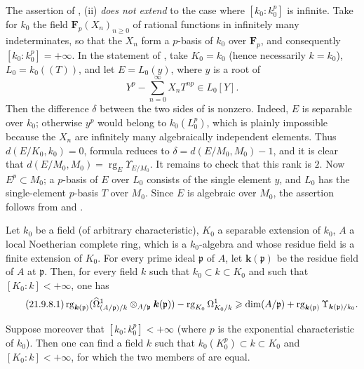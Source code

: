 \begin{remark}[21.9.7]
\label{0.21.9.7}
The assertion of , (ii) \emph{does not extend} to the case where $[k_0:k_0^p]$ is infinite.
Take for $k_0$ the field $\mathbf{F}_p(X_n)_{n\geqslant0}$ of rational functions in infinitely many indeterminates, so that the $X_n$ form a $p$-basis of $k_0$ over $\mathbf{F}_p$, and consequently $[k_0:k_0^p]=+\infty$.
In the statement of , take $K_0=k_0$ (hence necessarily $k=k_0$), $L_0=k_0((T))$, and let $E=L_0(y)$, where $y$ is a root of
\[
  Y^p-\sum_{n=0}^{\infty}X_nT^{np}\in L_0[Y].
\]
Then the difference $\delta$ between the two sides of  is nonzero.
Indeed, $E$ is separable over $k_0$; otherwise $y^p$ would belong to $k_0(L_0^p)$, which is plainly impossible because the $X_n$ are infinitely many algebraically independent elements.
Thus $d(E/K_0,k_0)=0$, formula  reduces to $\delta=d(E/M_0,M_0)-1$, and it is clear that $d(E/M_0,M_0)=\operatorname{rg}_E\Upsilon_{E/M_0}$.
It remains to check that this rank is $2$.
Now $E^p\subset M_0$; a $p$-basis of $E$ over $L_0$ consists of the single element $y$, and $L_0$ has the single-element $p$-basis $T$ over $M_0$.
Since $E$ is algebraic over $M_0$, the assertion follows from  and .
\end{remark}

\begin{proposition}[21.9.8]
\label{0.21.9.8}
Let $k_0$ be a field \textup{(}of arbitrary characteristic\textup{)}, $K_0$ a separable extension of $k_0$, $A$ a local Noetherian complete ring, which is a $k_0$-algebra and whose residue field is a finite extension of $K_0$.
For every prime ideal $\mathfrak{p}$ of $A$, let $\boldsymbol{k}(\mathfrak{p})$ be the residue field of $A$ at $\mathfrak{p}$.
Then, for every field $k$ such that $k_0\subset k\subset K_0$ and such that $[K_0:k]<+\infty$, one has
\begin{equation}
\tag{21.9.8.1}
  \label{0.21.9.8.1}
  \operatorname{rg}_{\boldsymbol{k}(\mathfrak{p})}(\widehat{\Omega}^1_{(A/\mathfrak{p})/k}\otimes_{A/\mathfrak{p}} \boldsymbol{k}(\mathfrak{p}))-\operatorname{rg}_{K_0}\Omega^1_{K_0/k}\geqslant\dim(A/\mathfrak{p})+\operatorname{rg}_{\boldsymbol{k}(\mathfrak{p})}\Upsilon_{\boldsymbol{k}(\mathfrak{p})/k_0}.
\end{equation}

Suppose moreover that $[k_0:k_0^p]<+\infty$ \textup{(}where $p$ is the exponential characteristic of $k_0$\textup{)}.
Then one can find a field $k$ such that $k_0(K_0^p)\subset k\subset K_0$ and $[K_0:k]<+\infty$, for which the two members of  are equal.
\end{proposition}

